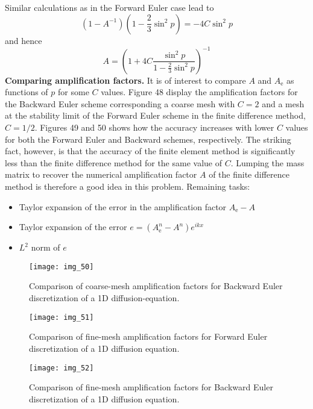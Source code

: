 \documentclass[../main.tex]{subfiles}
\begin{document}
		\noindent Similar calculations as in the Forward Euler case lead to
		$$
		\left(1-A^{-1}\right)\left(1-\frac{2}{3} \sin ^{2} p\right)=-4 C \sin ^{2} p
		$$
		and hence
		$$
		A=\left(1+4 C \frac{\sin ^{2} p}{1-\frac{2}{3} \sin ^{2} p}\right)^{-1}
		$$
		\noindent \textbf{Comparing amplification factors. } It is of interest to compare $A$ and $A_{\mathrm{e}}$ as functions of $p$ for some $C$ values. Figure 48 display the amplification factors for the Backward Euler scheme corresponding a coarse mesh with $C=2$ and a mesh at the stability limit of the Forward Euler scheme in the finite difference method, $C=1 / 2$. Figures 49 and 50 shows how the accuracy increases with lower $C$ values for both the Forward Euler and Backward schemes, respectively. The striking fact, however, is that the accuracy of the finite element method is significantly less than the finite difference method for the same value of $C$. Lumping the mass matrix to recover the numerical amplification factor $A$ of the finite difference method is therefore a good idea in this problem. Remaining tasks:
		\begin{itemize}
			\item Taylor expansion of the error in the amplification factor $A_{\mathrm{e}}-A$
			\item Taylor expansion of the error $e=\left(A_{\mathrm{e}}^{n}-A^{n}\right) e^{i k x}$
			\item $L^{2}$ norm of $e$
		\end{itemize}
		
		\begin{figure}
			\centering
			\texttt{[image: img\_50]}
			\caption{Comparison of coarse-mesh amplification factors for Backward Euler discretization of a 1D diffusion-equation.}
			\label{fig:img_48}
		\end{figure}
	
		\begin{figure}
			\centering
			\texttt{[image: img\_51]}
			\caption{Comparison of fine-mesh amplification factors for Forward Euler discretization of a 1D diffusion equation.}
			\label{fig:img_49}
		\end{figure}
	
		\begin{figure}
			\centering
			\texttt{[image: img\_52]}
			\caption{Comparison of fine-mesh amplification factors for Backward Euler discretization of a 1D diffusion equation.}
			\label{fig:img_50}
		\end{figure}

\clearpage
\end{document}
